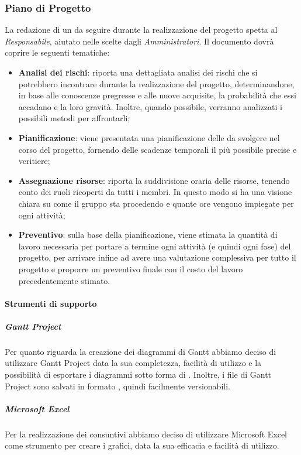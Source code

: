 \subsubsection{Piano di Progetto}
La redazione di un  da seguire durante la realizzazione del progetto spetta al \emph{Responsabile}, aiutato nelle scelte dagli \emph{Amministratori}. Il documento dovrà coprire le seguenti tematiche:
 \begin{itemize}
 	\item\textbf{{Analisi dei rischi}}: riporta una dettagliata analisi dei rischi che si potrebbero incontrare durante la realizzazione del progetto, determinandone, in base alle conoscenze pregresse e alle nuove acquisite, la probabilità che essi accadano e la loro gravità. Inoltre, quando possibile, verranno analizzati i possibili metodi per affrontarli;
 	\item\textbf{{Pianificazione}}: viene presentata una pianificazione delle  da svolgere nel corso del progetto, fornendo delle scadenze temporali il più possibile precise e veritiere;
 	\item {\textbf{Assegnazione risorse}: riporta la suddivisione oraria delle risorse, tenendo conto dei ruoli ricoperti da tutti i membri. In questo modo si ha una visione chiara su come il gruppo sta procedendo e quante ore vengono impiegate per ogni attività;}
 	\item\textbf{{Preventivo}}: sulla base della pianificazione, viene stimata la quantità di lavoro necessaria per portare a termine ogni attività (e quindi ogni fase) del progetto, per arrivare infine ad avere una valutazione complessiva per tutto il progetto e proporre un preventivo finale con il costo del lavoro precedentemente stimato.
 \end{itemize}

\paragraph{Strumenti di supporto}
\subparagraph{Gantt Project}\Spazio
Per quanto riguarda la creazione dei diagrammi di Gantt abbiamo deciso di utilizzare Gantt Project data la sua completezza, facilità di utilizzo e la possibilità di esportare i diagrammi sotto forma di . Inoltre, i file di Gantt Project sono salvati in formato , quindi facilmente versionabili.
\subparagraph{Microsoft Excel}\Spazio
Per la realizzazione dei consuntivi abbiamo deciso di utilizzare Microsoft Excel come strumento per creare i grafici, data la sua efficacia e facilità di utilizzo.
